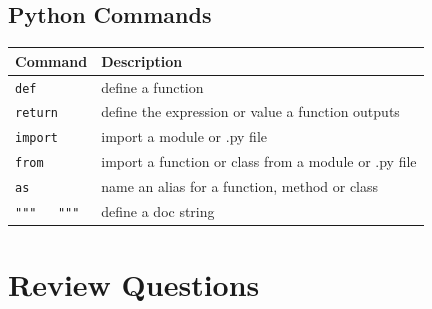\documentclass{book}
\begin{document}
    




    
        \subsection{Python Commands}\label{python-commands}

\begin{longtable}[]{@{}ll@{}}
\toprule
Command & Description\tabularnewline
\midrule
\endhead
\lstinline!def! & define a function\tabularnewline
\lstinline!return! & define the expression or value a function
outputs\tabularnewline
\lstinline!import! & import a module or .py file\tabularnewline
\lstinline!from! & import a function or class from a module or .py
file\tabularnewline
\lstinline!as! & name an alias for a function, method or
class\tabularnewline
\lstinline!"""   """! & define a doc string\tabularnewline
\bottomrule
\end{longtable}
    




    
        \section{Review Questions}\label{review-questions}
    
\end{document}
